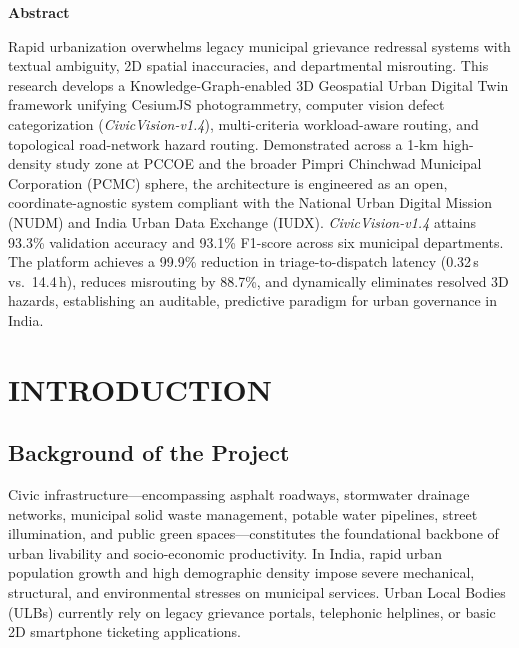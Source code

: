 \documentclass[12pt,a4paper]{report}
\begin{document}
\newpage
\begin{center}
    {\fontsize{12pt}{15pt}\selectfont \textbf{Abstract}}
\end{center}
\noindent Rapid urbanization overwhelms legacy municipal grievance redressal systems with textual ambiguity, 2D spatial inaccuracies, and departmental misrouting. This research develops a Knowledge-Graph-enabled 3D Geospatial Urban Digital Twin framework unifying CesiumJS photogrammetry, computer vision defect categorization (\textit{CivicVision-v1.4}), multi-criteria workload-aware routing, and topological road-network hazard routing. Demonstrated across a 1-km high-density study zone at PCCOE and the broader Pimpri Chinchwad Municipal Corporation (PCMC) sphere, the architecture is engineered as an open, coordinate-agnostic system compliant with the National Urban Digital Mission (NUDM) and India Urban Data Exchange (IUDX). \textit{CivicVision-v1.4} attains 93.3\% validation accuracy and 93.1\% F1-score across six municipal departments. The platform achieves a 99.9\% reduction in triage-to-dispatch latency (0.32\,s vs.\ 14.4\,h), reduces misrouting by 88.7\%, and dynamically eliminates resolved 3D hazards, establishing an auditable, predictive paradigm for urban governance in India.

\newpage
\chapter{INTRODUCTION}

\section{Background of the Project}
Civic infrastructure—encompassing asphalt roadways, stormwater drainage networks, municipal solid waste management, potable water pipelines, street illumination, and public green spaces—constitutes the foundational backbone of urban livability and socio-economic productivity. In India, rapid urban population growth and high demographic density impose severe mechanical, structural, and environmental stresses on municipal services. Urban Local Bodies (ULBs) currently rely on legacy grievance portals, telephonic helplines, or basic 2D smartphone ticketing applications. 
\end{document}
